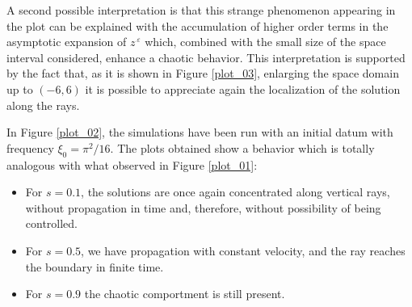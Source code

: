 \documentclass[10pt]{article}
\newcommand{\ue}[1]{#1^{\,\varepsilon}}
\begin{document}
A second possible interpretation is that this strange phenomenon appearing in the plot can be explained with the accumulation of higher order terms in the asymptotic expansion of $\ue{z}$ which, combined with the small size of the space interval considered, enhance a chaotic behavior. This interpretation is supported by the fact that, as it is shown in Figure \ref{plot_03}, enlarging the space domain up to $(-6,6)$ it is possible to appreciate again the localization of the solution along the rays.	

In Figure \ref{plot_02}, the simulations have been run with an initial datum with frequency $\xi_0=\pi^2/16$. The plots obtained show a behavior which is totally analogous with what observed in Figure \ref{plot_01}:
\begin{itemize}
	\item For $s=0.1$, the solutions are once again concentrated along vertical rays, without propagation in time and, therefore, without possibility of being controlled.
	
	\item For $s=0.5$, we have propagation with constant velocity, and the ray reaches the boundary in finite time.
	
	\item For $s=0.9$ the chaotic comportment is still present.
\end{itemize}
\end{document}

